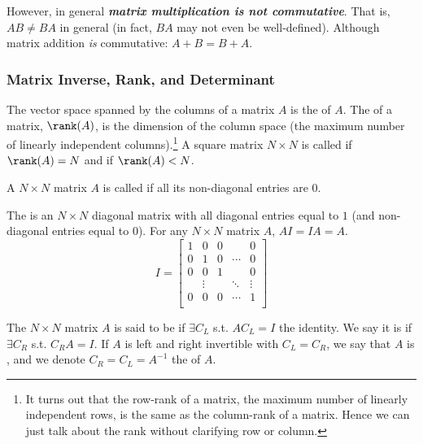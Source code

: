 \documentclass{article}
\begin{document}
However, in general \textbf{\textit{matrix multiplication is not commutative}}. That is, $AB \ne BA$ in general (in fact, $BA$ may not even be well-defined). Although matrix addition \textit{is} commutative: $A + B = B + A$.

\subsubsection{Matrix Inverse, Rank, and Determinant}
\label{ssub:matrix_inverse_rank_and_determinant}

\begin{definition}
  The vector space spanned by the columns of a matrix $A$ is the  of $A$. The  of a matrix, $\rank(A)$, is the dimension of the column space (the maximum number of linearly independent columns).\footnote{It turns out that the row-rank of a matrix, the maximum number of linearly independent rows, is the same as the column-rank of a matrix. Hence  we can just  talk about the rank without clarifying row or column.} A square matrix $N \times N$ is called  if $\rank(A) = N$ and  if $\rank(A) < N$.
\end{definition}

\begin{definition}
  A $N \times N$ matrix $A$ is called  if all its non-diagonal entries are $0$.
\end{definition}

\begin{definition}
  The  is an $N \times N$ diagonal matrix with all diagonal entries equal to $1$ (and non-diagonal entries equal to $0$). For any $N \times N$ matrix $A$, $AI = IA = A$.
  \[
    I = \left[\begin{matrix}
        1    & 0      & 0 &        & 0      \\
        0    & 1      & 0 & \cdots & 0      \\
        0    & 0      & 1 &        & 0      \\
             & \vdots &   & \ddots & \vdots \\
        0    & 0      & 0 & \cdots & 1      \\
    \end{matrix}\right]
  \]
\end{definition}

\begin{definition}
  The $N \times N$ matrix $A$ is said to be  if $\exists C_L$ s.t. $AC_L = I$ the identity. We say it is  if $\exists C_R$ s.t. $C_RA = I$. If $A$ is left and right invertible with $C_L = C_R$, we say that $A$ is , and we denote $C_R = C_L = A^{-1}$ the  of $A$.
\end{definition}
\end{document}
